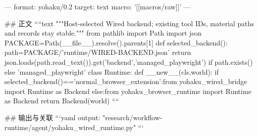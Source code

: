 ---
format: yohaku/0.2
target: text
macro: '[[macros/raw]]'
---

## 正文
````text
"""Host-selected Wired backend; existing tool IDs, material paths and records stay stable."""
from pathlib import Path
import json
PACKAGE=Path(__file__).resolve().parents[1]
def selected_backend():
 path=PACKAGE/'runtime/WIRED-BACKEND.json'
 return json.loads(path.read_text()).get('backend','managed_playwright') if path.exists() else 'managed_playwright'
class Runtime:
 def __new__(cls,world):
  if selected_backend()=='normal_browser_extension':from yohaku_wired_bridge import Runtime as Backend
  else:from yohaku_browser_runtime import Runtime as Backend
  return Backend(world)
````

## 输出与关联
```yaml
output: "research/workflow-runtime/agent/yohaku_wired_runtime.py"
```
